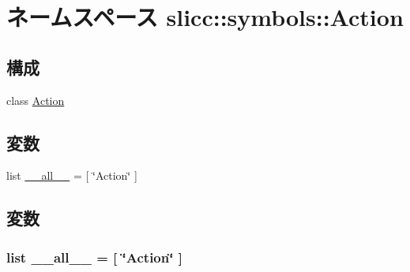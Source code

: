 \hypertarget{namespaceslicc_1_1symbols_1_1Action}{
\section{ネームスペース slicc::symbols::Action}
\label{namespaceslicc_1_1symbols_1_1Action}
}
\subsection*{構成}
\begin{DoxyCompactItemize}
\item 
class \hyperlink{classslicc_1_1symbols_1_1Action_1_1Action}{Action}
\end{DoxyCompactItemize}
\subsection*{変数}
\begin{DoxyCompactItemize}
\item 
list \hyperlink{namespaceslicc_1_1symbols_1_1Action_aa4a022e6ddacd362b83964da5cc5d044}{\_\-\_\-all\_\-\_\-} = \mbox{[} \char`\"{}Action\char`\"{} \mbox{]}
\end{DoxyCompactItemize}


\subsection{変数}
\hypertarget{namespaceslicc_1_1symbols_1_1Action_aa4a022e6ddacd362b83964da5cc5d044}{
\subsubsection[{\_\-\_\-all\_\-\_\-}]{\setlength{\rightskip}{0pt plus 5cm}list {\bf \_\-\_\-all\_\-\_\-} = \mbox{[} \char`\"{}Action\char`\"{} \mbox{]}}}
\label{namespaceslicc_1_1symbols_1_1Action_aa4a022e6ddacd362b83964da5cc5d044}
